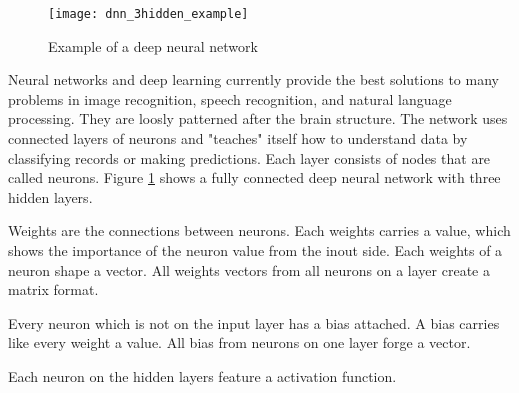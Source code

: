 \begin{figure}[H]
    \centering
    \texttt{[image: dnn\_3hidden\_example]}
    \caption{\cite{dnn_3hidden_example_image} Example of a deep neural network}
    \label{fig:dnn_3hidden_example}
\end{figure}

Neural networks and deep learning currently provide the best solutions to many problems in image recognition, speech recognition, and natural language processing.
\cite{nielsen-book}
They are loosly patterned after the brain structure.
The network uses connected layers of neurons and "teaches" itself how to understand data by classifying records or making predictions.
\cite{ibm-watson-healthcare}
Each layer consists of nodes that are called neurons.
Figure \ref{fig:dnn_3hidden_example} shows a fully connected deep neural network with three hidden layers.

Weights are the connections between neurons.
Each weights carries a value, which shows the importance of the neuron value from the inout side.
Each weights of a neuron shape a vector.
All weights vectors from all neurons on a layer create a matrix format.

Every neuron which is not on the input layer has a bias attached.
A bias carries like every weight a value.
All bias from neurons on one layer forge a vector.

Each neuron on the hidden layers feature a activation function.

